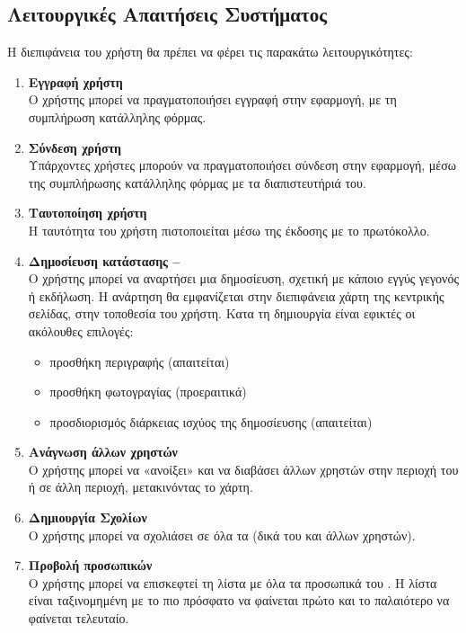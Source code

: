 \subsection{Λειτουργικές Απαιτήσεις Συστήματος}
Η διεπιφάνεια του χρήστη θα πρέπει να φέρει τις παρακάτω λειτουργικότητες:

\begin{enumerate}
    \item \textbf{Εγγραφή χρήστη} \\
    Ο χρήστης μπορεί να πραγματοποιήσει εγγραφή στην εφαρμογή, με τη συμπλήρωση κατάλληλης φόρμας.
    \item \textbf{Σύνδεση χρήστη} \\
    Υπάρχοντες χρήστες μπορούν να πραγματοποιήσει σύνδεση στην εφαρμογή, μέσω της συμπλήρωσης κατάλληλης φόρμας με τα διαπιστευτήριά του.
    \item \textbf{Ταυτοποίηση χρήστη} \\
    Η ταυτότητα του χρήστη πιστοποιείται μέσω της έκδοσης  με το  πρωτόκολλο.
    \item \textbf{Δημοσίευση κατάστασης -- } \\
    Ο χρήστης μπορεί να αναρτήσει μια δημοσίευση, σχετική με κάποιο εγγύς γεγονός ή εκδήλωση. Η ανάρτηση θα εμφανίζεται στην διεπιφάνεια χάρτη της κεντρικής σελίδας, στην τοποθεσία του χρήστη. Κατα τη δημιουργία  είναι εφικτές οι ακόλουθες επιλογές:
    \begin{itemize}
        \item προσθήκη περιγραφής (απαιτείται)
        \item προσθήκη φωτογραγίας (προεραιτικά)
        \item προσδιορισμός διάρκειας ισχύος της δημοσίευσης (απαιτείται)
    \end{itemize}
    \item \textbf{Ανάγνωση  άλλων χρηστών} \\
    Ο χρήστης μπορεί να «ανοίξει» και να διαβάσει  άλλων χρηστών στην περιοχή του ή σε άλλη περιοχή, μετακινόντας το χάρτη.
    \item \textbf{Δημιουργία Σχολίων} \\
    Ο χρήστης μπορεί να σχολιάσει σε όλα τα  (δικά του και άλλων χρηστών).
    \item \textbf{Προβολή προσωπικών } \\
    Ο χρήστης μπορεί να επισκεφτεί τη λίστα με όλα τα προσωπικά του . Η λίστα είναι ταξινομημένη με το πιο πρόσφατο  να φαίνεται πρώτο και το παλαιότερο  να φαίνεται τελευταίο.

\end{enumerate}
